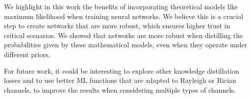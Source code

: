 \documentclass[conference]{IEEEtran}
\newcommand{\pf}[1]{{\textcolor{orange}{PF: {#1}}}}
\begin{document}
We highlight in this work the benefits of incorporating theoretical models like maximum likelihood when training neural networks. We believe this is a crucial step to create networks that are more robust, which ensures higher trust in critical scenarios. We showed that networks are more robust when distilling the probabilities given by these mathematical models, even when they operate under different priors.

For future work, it could be interesting to explore other knowledge distillation losses and to use better ML functions that are adapted to Rayleigh or Rician channels, to improve the results when considering multiple types of channels. 



\end{document}

